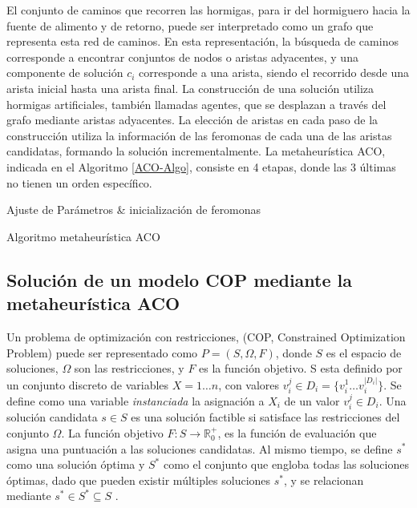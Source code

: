El conjunto de caminos que recorren las hormigas, para ir del hormiguero hacia la fuente de alimento y de retorno, puede ser interpretado como un grafo que representa esta red de caminos. En esta representaci\'on, la b\'usqueda de caminos corresponde a encontrar conjuntos de nodos o aristas adyacentes, y una componente de soluci\'on $c_{i}$ corresponde a una arista, siendo el recorrido desde una arista inicial hasta una arista final. La construcci\'on de una soluci\'on utiliza hormigas artificiales, tambi\'en llamadas agentes, que se desplazan a trav\'es del grafo mediante aristas adyacentes. La elecci\'on de aristas en cada paso de la construcci\'on utiliza la informaci\'on de las feromonas de cada una de las aristas candidatas, formando la soluci\'on incrementalmente. La metaheur\'istica ACO, indicada en el Algoritmo \ref{ACO-Algo}, consiste en 4 etapas, donde las 3 \'ultimas no tienen un orden espec\'ifico.

\begin{algorithm}[H]
\SetAlgoLined
 Ajuste de Par\'ametros \& inicializaci\'on de feromonas\;
 \caption{Algoritmo metaheur\'istica ACO}\label{ACO-Algo}
\end{algorithm}



\subsection{Soluci\'on de un modelo COP mediante la metaheur\'istica ACO}

Un problema de optimización con restricciones, (COP, Constrained Optimization Problem) puede ser representado como $P = (S, \Omega, F)$, donde $S$ es el espacio de soluciones, $\Omega$ son las restricciones, y $F$ es la funci\'on objetivo. S esta definido por un conjunto discreto de variables $X = 1 \dotsc n$, con valores $v_{i}^{j} \in D_{i} = \{v_{i}^{1} \dotsc  v_{i}^{|D_{i}|}\}$. Se define como una variable {\it instanciada} la asignaci\'on a $X_i$ de un valor $v_{i}^{j} \in D_i$. Una solución candidata $s \in S$ es una soluci\'on factible si satisface las restricciones del conjunto $\Omega$. La funci\'on objetivo $F: S\rightarrow \mathbb R_{0}^{+}$, es la funci\'on de evaluaci\'on que asigna una puntuaci\'on a las soluciones candidatas. Al mismo tiempo, se define $s^{*}$ como una soluci\'on \'optima y $S^{*}$ como el conjunto que engloba todas las soluciones \'optimas, dado que pueden existir m\'ultiples soluciones $s^{*}$, y se relacionan mediante $s^{*} \in S^{*} \subseteq S $ .


